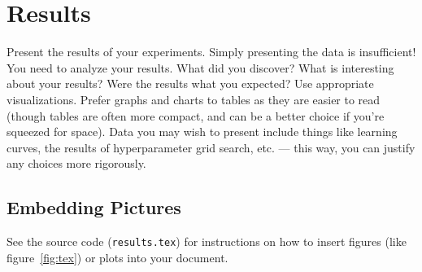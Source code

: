 
\section{Results}
\label{sec:results}

Present the results of your experiments. Simply presenting the data is
insufficient! You need to analyze your results. What did you discover?
What is interesting about your results? Were the results what you
expected? Use appropriate visualizations. Prefer graphs and charts to
tables as they are easier to read (though tables are often more
compact, and can be a better choice if you're squeezed for space).
Data you may wish to present include things like learning curves, the
results of hyperparameter grid search, etc. --- this way, you can
justify any choices more rigorously.

\subsection{Embedding Pictures}
\label{subsec:pics}

See the source code (\texttt{results.tex}) for instructions on how to
insert figures (like figure~\ref{fig:tex}) or plots into your
document.

